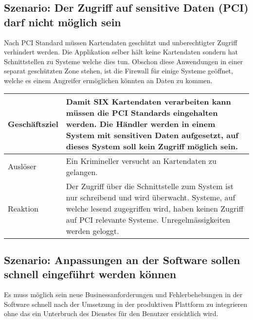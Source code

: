 \subsection{Szenario: Der Zugriff auf sensitive Daten (PCI) darf nicht möglich sein}
Nach PCI Standard müssen Kartendaten geschützt und unberechtigter Zugriff verhindert werden. Die Applikation selber hält keine Kartendaten sondern hat Schnittstellen zu Systeme welche dies tun. Obschon diese Anwendungen in einer separat geschützten Zone stehen, ist die Firewall für einige Systeme geöffnet, welche es einem Angreifer ermöglichen könnten an Daten zu kommen.

\begin{table}[H]
	\centering
	\begin{tabular}{ | p{3cm} | p{12cm} | }
		\toprule
		Geschäftsziel & Damit SIX Kartendaten verarbeiten kann müssen die PCI Standards eingehalten werden. Die Händler werden in einem System mit sensitiven Daten aufgesetzt, auf dieses System soll kein Zugriff möglich sein. \\ \hline
		Auslöser & Ein Krimineller versucht an Kartendaten zu gelangen. \\ \hline
		Reaktion & Der Zugriff über die Schnittstelle zum System ist nur schreibend und wird überwacht. Systeme, auf welche lesend zugegriffen wird, haben keinen Zugriff auf PCI relevante Systeme. Unregelmässigkeiten werden geloggt. \\
		\bottomrule
	\end{tabular}
\end{table}

\subsection{Szenario: Anpassungen an der Software sollen schnell eingeführt werden können}

Es muss möglich sein neue Businessanforderungen und Fehlerbehebungen in der Software schnell nach der Umsetzung in der produktiven Plattform zu integrieren ohne das ein Unterbruch des Dienstes für den Benutzer ersichtlich wird.

